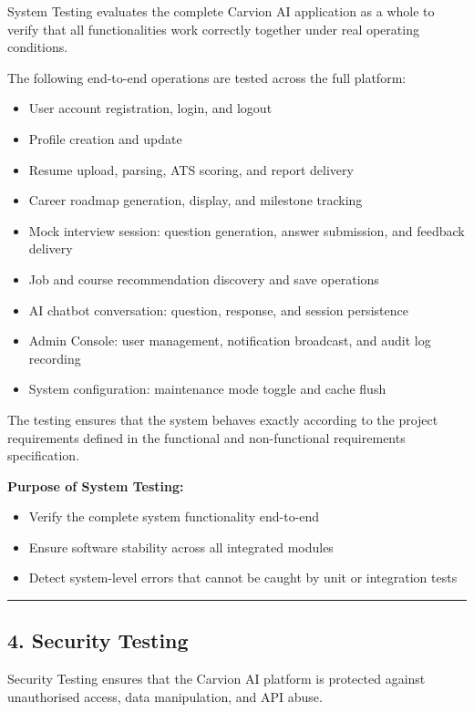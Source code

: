 \documentclass[12pt]{article}
\begin{document}
System Testing evaluates the complete Carvion AI application as a whole to verify that all functionalities work correctly together under real operating conditions.

The following end-to-end operations are tested across the full platform:

\begin{itemize}
  \item User account registration, login, and logout
  \item Profile creation and update
  \item Resume upload, parsing, ATS scoring, and report delivery
  \item Career roadmap generation, display, and milestone tracking
  \item Mock interview session: question generation, answer submission, and feedback delivery
  \item Job and course recommendation discovery and save operations
  \item AI chatbot conversation: question, response, and session persistence
  \item Admin Console: user management, notification broadcast, and audit log recording
  \item System configuration: maintenance mode toggle and cache flush
\end{itemize}

The testing ensures that the system behaves exactly according to the project requirements defined in the functional and non-functional requirements specification.

\textbf{Purpose of System Testing:}

\begin{itemize}
  \item Verify the complete system functionality end-to-end
  \item Ensure software stability across all integrated modules
  \item Detect system-level errors that cannot be caught by unit or integration tests
\end{itemize}

\noindent\rule{\textwidth}{0.4pt}

\subsection{4. Security Testing}

Security Testing ensures that the Carvion AI platform is protected against unauthorised access, data manipulation, and API abuse.
\end{document}
